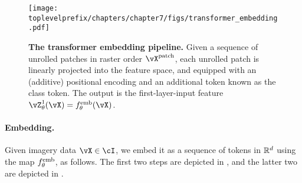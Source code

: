 \documentclass[../../book-main.tex]{subfiles}
\begin{document}
\begin{figure}
    \centering 
    \texttt{[image: \\toplevelprefix/chapters/chapter7/figs/transformer\_embedding.pdf]}
    \caption{\small\textbf{The transformer embedding pipeline.} Given a sequence of unrolled patches in raster order \(\vX^{\patch}\), each unrolled patch is linearly projected into the feature space, and equipped with an (additive) positional encoding and an additional token known as the class token. The output is the first-layer-input feature \(\vZ_{\theta}^{1}(\vX) = f_{\theta}^{\emb}(\vX)\).}
    \label{fig:transformer_embedding}
\end{figure}

\paragraph{Embedding.} Given imagery data \(\vX \in \cI\), we embed it as a sequence of tokens in \(\mathbb{R}^{d}\) using the map \(f_{\theta}^{\mathrm{emb}}\), as follows. The first two steps are depicted in , and the latter two are depicted in .
\end{document}
